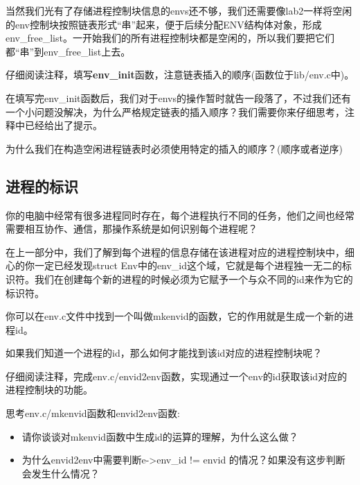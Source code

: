 当然我们光有了存储进程控制块信息的envs还不够，我们还需要像lab2一样将空闲的env控制块按照链表形式“串”起来，便于后续分配ENV结构体对象，形成env\_free\_list。一开始我们的所有进程控制块都是空闲的，所以我们要把它们都“串”到env\_free\_list上去。

\begin{exercise}
仔细阅读注释，填写\textbf{env\_init}函数，注意链表插入的顺序(函数位于lib/env.c中)。
\end{exercise}

在填写完env\_init函数后，我们对于envs的操作暂时就告一段落了，不过我们还有一个小问题没解决，为什么严格规定链表的插入顺序？我们需要你来仔细思考，注释中已经给出了提示。

\begin{thinking}\label{think-env_init}
    为什么我们在构造空闲进程链表时必须使用特定的插入的顺序？(顺序或者逆序)
\end{thinking}

\subsection{进程的标识}

你的电脑中经常有很多进程同时存在，每个进程执行不同的任务，他们之间也经常需要相互协作、通信，那操作系统是如何识别每个进程呢？

在上一部分中，我们了解到每个进程的信息存储在该进程对应的进程控制块中，细心的你一定已经发现struct Env中的env\_id这个域，它就是每个进程独一无二的标识符。我们在创建每个新的进程的时候必须为它赋予一个与众不同的id来作为它的标识符。

你可以在env.c文件中找到一个叫做mkenvid的函数，它的作用就是生成一个新的进程id。

如果我们知道一个进程的id，那么如何才能找到该id对应的进程控制块呢？

\begin{exercise}
仔细阅读注释，完成env.c/envid2env函数，实现通过一个env的id获取该id对应的进程控制块的功能。
\end{exercise}

\begin{thinking}\label{think-mkenvid}
思考env.c/mkenvid函数和envid2env函数:
\begin{itemize}
    \item 请你谈谈对mkenvid函数中生成id的运算的理解，为什么这么做？
    \item 为什么envid2env中需要判断e->env\_id != envid 的情况？如果没有这步判断会发生什么情况？
\end{itemize}
\end{thinking}

